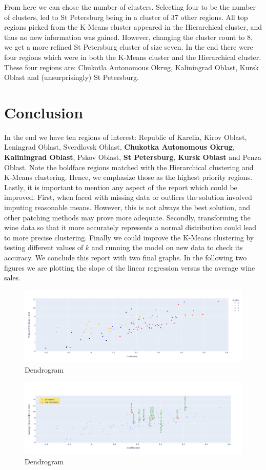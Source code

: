 \documentclass{article}
\begin{document}
\noindent From here we can chose the number of clusters. Selecting four to be the number of clusters, led to St Petersburg being in a cluster of 37 other regions. All top regions picked from the K-Means cluster appeared in the Hierarchical cluster, and thus no new information was gained. However, changing the cluster count to 8, we get a more refined St Petersburg cluster of size seven. In the end there were four regions which were in both the K-Means cluster and the Hierarchical cluster. These four regions are: Chukotla Autonomous Okrug, Kaliningrad Oblast, Kursk Oblast and (unsurprisingly) St Petersburg.

\section{Conclusion}
In the end we have ten regions of interest: Republic of Karelia, Kirov Oblast, Leningrad Oblast, Sverdlovsk Oblast, \textbf{Chukotka Autonomous Okrug},\textbf{ Kaliningrad Oblast}, Pskov Oblast, \textbf{St Petersburg}, \textbf{Kursk Oblast} and Penza Oblast. Note the boldface regions matched with the Hierarchical clustering and K-Means clustering. Hence, we emphasize those as the highest priority regions. Lastly, it is important to mention any aspect of the report which could be improved. First, when faced with missing data or outliers the solution involved imputing reasonable means. However, this is not always the best solution, and other patching methods may prove more adequate. Secondly, transforming the wine data so that it more accurately represents a normal distribution could lead to more precise clustering. Finally we could improve the K-Means clustering by testing different values of $k$ and running the model on new data to check its accuracy. We conclude this report with two final graphs. In the following two figures we are plotting the slope of the linear regression versus the average wine sales.


\begin{figure}[!htb]
    \centering
    \includegraphics[scale = .29]{Graphs/Coeffiecient_scatter.png}
    \caption{Dendrogram}
    \label{fig:dendrogram}
\end{figure}

\begin{figure}[!htb]
    \centering
    \includegraphics[scale = .3]{Graphs/Coefficent_scatter_target.png}
    \caption{Dendrogram}
    \label{fig:dendrogram}
\end{figure}
\end{document}

